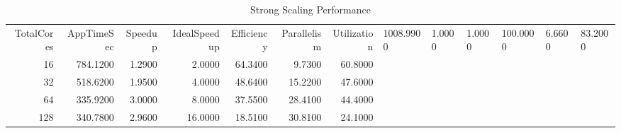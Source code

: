\begin{table}
\caption{Strong Scaling Performance}
\label{tab:table1_strong_performance}
\begin{tabular}{rrrrrrr}
\toprule
TotalCores & AppTimeSec & Speedup & IdealSpeedup & Efficiency & Parallelism & Utilization%
 & 1008.9900 & 1.0000 & 1.0000 & 100.0000 & 6.6600 & 83.2000 \\
16 & 784.1200 & 1.2900 & 2.0000 & 64.3400 & 9.7300 & 60.8000 \\
32 & 518.6200 & 1.9500 & 4.0000 & 48.6400 & 15.2200 & 47.6000 \\
64 & 335.9200 & 3.0000 & 8.0000 & 37.5500 & 28.4100 & 44.4000 \\
128 & 340.7800 & 2.9600 & 16.0000 & 18.5100 & 30.8100 & 24.1000 \\
\bottomrule
\end{tabular}
\end{table}

